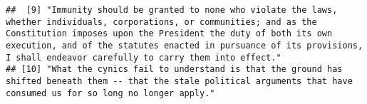 \documentclass[]{article}
\newenvironment{Shaded}{\begin{snugshade}}{\end{snugshade}}
\newcommand{\OperatorTok}[1]{\textcolor[rgb]{0.81,0.36,0.00}{\textbf{#1}}}
\newcommand{\NormalTok}[1]{#1}
\begin{document}
\begin{verbatim}
##  [9] "Immunity should be granted to none who violate the laws, whether individuals, corporations, or communities; and as the Constitution imposes upon the President the duty of both its own execution, and of the statutes enacted in pursuance of its provisions, I shall endeavor carefully to carry them into effect."                                     
## [10] "What the cynics fail to understand is that the ground has shifted beneath them -- that the stale political arguments that have consumed us for so long no longer apply."
\end{verbatim}

\begin{Shaded}
\end{Shaded}
\end{document}
